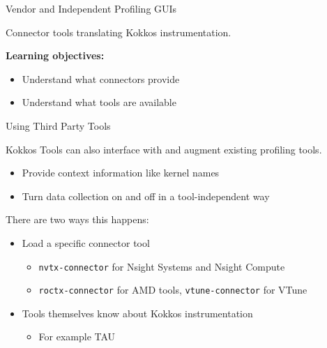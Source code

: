 \begin{frame}[fragile]

  {\Huge Vendor and Independent Profiling GUIs}

  \vspace{10pt}

  {\large Connector tools translating Kokkos instrumentation.}

  \vspace{20pt}

  \textbf{Learning objectives:}
  \begin{itemize}
    \item {Understand what connectors provide}
    \item {Understand what tools are available}
  \end{itemize}

  \vspace{-20pt}

\end{frame}


\begin{frame}[fragile]{Using Third Party Tools}

  Kokkos Tools can also interface with and augment existing profiling tools.

  \begin{itemize}
    \item Provide context information like kernel names
    \item Turn data collection on and off in a tool-independent way
  \end{itemize}

  \vspace{10pt}
  There are two ways this happens:
  \begin{itemize}
    \item Load a specific connector tool
    \begin{itemize}
      \item \texttt{nvtx-connector} for Nsight Systems and Nsight Compute
      \item \texttt{roctx-connector} for AMD tools, \texttt{vtune-connector} for VTune
    \end{itemize}
    \item Tools themselves know about Kokkos instrumentation
    \begin{itemize}
      \item For example TAU
    \end{itemize}
  \end{itemize}

\end{frame}

